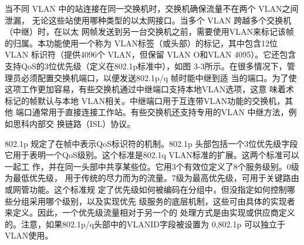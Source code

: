 当不同 VLAN 中的站连接在同一交换机时，交换机确保流量不在两个 VLAN之间泄漏，
无论这些站使用哪种类型的以太网接口。当多个 VLAN 跨越多个交换机（中继）时，在以太
网帧发送到另一台交换机之前，需要使用VLAN来标记该帧的归属。本功能使用一个称为
VLAN标签（或头部）的标记，其中包含12位 VLAN 标识符（提供4096个 VLAN，但保留
VLAN O和VLAN 4095）。它还包含支持QoS的3位优先级（定义在802.1p标准中），如图
3-3所示。在很多情况下，管理员必须配置交换机端口，以便发送802.1p/q 帧时能中继到适
当的端口。为了使这项工作更加容易，有些交换机通过中继端口支持本地VLAN选项，这意
味着术标记的帧默认与本地 VLAN相关。中继端口用于互连带VLAN功能的交换机，其他
端口通常用于直接连接工作站。有些交换机还支持专用的VLAN 中继方法，例如思科内部交
换链路（ISL）协议。

802.1p 规定了在帧中表示QoS标识符的机制。802.1p 头部包括一个3位优先级字段
它用于表明一个QoS级别。这个标准是802.1q VLAN标准的扩展。这两个标准可以一起工
作，并在同一头部中共享某些位。它用3个有效位定义了8个服务级别。0级为最低优先级，
用于传统的尽力而为的流量。7级为最高优先级，可用于关键路由或网管功能。这个标准规
定了优先级如何被编码在分组中，但没指定如何控制哪些分组采用哪个级别，以及实现优先
级服务的底层机制，这些可由具体的实现者来定义。因此，一个优先级流量相对于另一个的
处理方式是由实现或供应商定义的。注意，如果802.1p/q头部中的VLANID字段被设置为
0,802.1p 可以独立于 VLAN使用。

